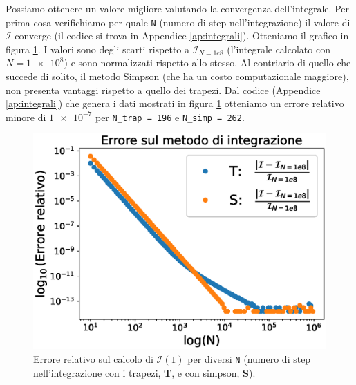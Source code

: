 \documentclass[a4paper, titlepage]{article}
\begin{document}
Possiamo ottenere un valore migliore valutando la convergenza dell'integrale. Per prima cosa verifichiamo per quale \texttt{N} (numero di step nell'integrazione) il valore di $\mathcal{I}$ converge (il codice si trova in Appendice \ref{ap:integrali}).
Otteniamo il grafico in figura \ref{fig:Pot_cvgN}.
I valori sono degli scarti rispetto a $\mathcal{I}_{N = 1e8}$ (l'integrale calcolato con $N = \num{1e8}$) e sono normalizzati rispetto allo stesso.
Al contriario di quello che succede di solito, il metodo Simpson (che ha un costo computazionale maggiore), non presenta vantaggi rispetto a quello dei trapezi.
Dal codice (Appendice \ref{ap:integrali}) che genera i dati mostrati in figura \ref{fig:Pot_cvgN} otteniamo un errore relativo minore di $\num{1e-7}$ per \texttt{N\_trap = 196} e \texttt{N\_simp = 262}.
\begin{figure}[h]
    \begin{minipage}{0.49 \textwidth}
        \centering
        \includegraphics[width = \textwidth]{Figures/Pot_cvgN.eps}
        \caption{Errore relativo sul calcolo di $\mathcal I(1)$ per diversi \texttt{N} (numero di step nell'integrazione con i trapezi, \textbf{T}, e con simpson, \textbf{S}).  \\ \\}
        \label{fig:Pot_cvgN}
    \end{minipage}
    \hspace{0.01 \textwidth}
    \begin{minipage}{0.49 \textwidth}
        \centering

\end{minipage}
\end{figure}
\end{document}
